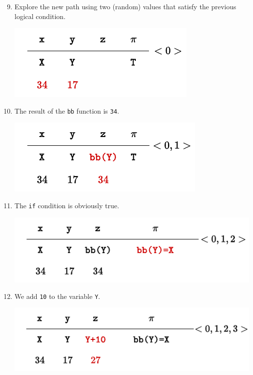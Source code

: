 \begin{examplebox}
    \begin{enumerate}
        \setcounter{enumi}{8}
        \item Explore the new path using two (random) values that satisfy the previous logical condition.
        \begin{center}
            \includegraphics[width=.5\textwidth]{img/concolic-execution-9.pdf}
        \end{center}

        \item The result of the \texttt{bb} function is \texttt{34}.
        \begin{center}
            \includegraphics[width=.5\textwidth]{img/concolic-execution-10.pdf}
        \end{center}

        \item The \texttt{if} condition is obviously true.
        \begin{center}
            \includegraphics[width=.7\textwidth]{img/concolic-execution-11.pdf}
        \end{center}

        \newpage

        \item We add \texttt{10} to the variable \texttt{Y}.
        \begin{center}
            \includegraphics[width=.7\textwidth]{img/concolic-execution-12.pdf}
        \end{center}


\end{enumerate}
\end{examplebox}
